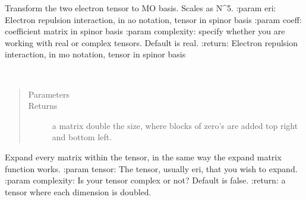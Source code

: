 \documentclass[letterpaper,10pt,english]{sphinxmanual}
\begin{document}

\begin{fulllineitems}
\label{\detokenize{SCF_functions:hf.SCF_functions.eri_ao_to_mo}}
Transform the two electron tensor to MO basis. Scales as N\textasciicircum{}5.
:param eri: Electron repulsion interaction, in ao notation, tensor in spinor basis
:param coeff: coefficient matrix in spinor basis
:param complexity: specify whether you are working with real or complex tensors. Default is real.
:return: Electron repulsion interaction, in mo notation, tensor in spinor basis

\end{fulllineitems}


\begin{fulllineitems}
\label{\detokenize{SCF_functions:hf.SCF_functions.expand_matrix}}~\begin{quote}\begin{description}
\item[{Parameters}] \leavevmode
{} \textendash{} 

\item[{Returns}] \leavevmode
a matrix double the size, where blocks of zero’s are added top right and bottom left.

\end{description}\end{quote}

\end{fulllineitems}


\begin{fulllineitems}
\label{\detokenize{SCF_functions:hf.SCF_functions.expand_tensor}}
Expand every matrix within the tensor, in the same way the expand matrix function works.
:param tensor: The tensor, usually eri, that you wish to expand.
:param complexity: Is your tensor complex or not? Default is false.
:return: a tensor where each dimension is doubled.

\end{fulllineitems}
\end{document}
